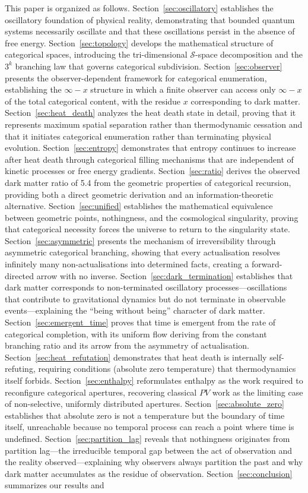\documentclass[12pt,a4paper]{article}
\theoremstyle{definition}
\theoremstyle{remark}
\newcommand{\Sentropy}{\mathcal{S}}
\begin{document}
This paper is organized as follows. Section~\ref{sec:oscillatory} establishes the oscillatory foundation of physical reality, demonstrating that bounded quantum systems necessarily oscillate and that these oscillations persist in the absence of free energy. Section~\ref{sec:topology} develops the mathematical structure of categorical spaces, introducing the tri-dimensional $\Sentropy$-space decomposition and the $3^k$ branching law that governs categorical subdivision. Section~\ref{sec:observer} presents the observer-dependent framework for categorical enumeration, establishing the $\infty - x$ structure in which a finite observer can access only $\infty - x$ of the total categorical content, with the residue $x$ corresponding to dark matter. Section~\ref{sec:heat_death} analyzes the heat death state in detail, proving that it represents maximum spatial separation rather than thermodynamic cessation and that it initiates categorical enumeration rather than terminating physical evolution. Section~\ref{sec:entropy} demonstrates that entropy continues to increase after heat death through categorical filling mechanisms that are independent of kinetic processes or free energy gradients. Section~\ref{sec:ratio} derives the observed dark matter ratio of 5.4 from the geometric properties of categorical recursion, providing both a direct geometric derivation and an information-theoretic alternative. Section~\ref{sec:unified} establishes the mathematical equivalence between geometric points, nothingness, and the cosmological singularity, proving that categorical necessity forces the universe to return to the singularity state. Section~\ref{sec:asymmetric} presents the mechanism of irreversibility through asymmetric categorical branching, showing that every actualisation resolves infinitely many non-actualisations into determined facts, creating a forward-directed arrow with no inverse. Section~\ref{sec:dark_termination} establishes that dark matter corresponds to non-terminated oscillatory processes—oscillations that contribute to gravitational dynamics but do not terminate in observable events—explaining the ``being without being'' character of dark matter. Section~\ref{sec:emergent_time} proves that time is emergent from the rate of categorical completion, with its uniform flow deriving from the constant branching ratio and its arrow from the asymmetry of actualisation. Section~\ref{sec:heat_refutation} demonstrates that heat death is internally self-refuting, requiring conditions (absolute zero temperature) that thermodynamics itself forbids. Section~\ref{sec:enthalpy} reformulates enthalpy as the work required to reconfigure categorical apertures, recovering classical $PV$ work as the limiting case of non-selective, uniformly distributed apertures. Section~\ref{sec:absolute_zero} establishes that absolute zero is not a temperature but the boundary of time itself, unreachable because no temporal process can reach a point where time is undefined. Section~\ref{sec:partition_lag} reveals that nothingness originates from partition lag—the irreducible temporal gap between the act of observation and the reality observed—explaining why observers always partition the past and why dark matter accumulates as the residue of observation. Section~\ref{sec:conclusion} summarizes our results and 
\end{document}
